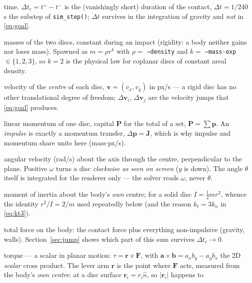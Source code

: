 \documentclass[a4paper,11pt]{article}
\newcommand{\vV}{\bm{v}}
\newcommand{\Jimp}{\bm{J}}
\newcommand{\hh}{\hat{n}}
\newcommand{\pp}{\bm{p}}          %
\newcommand{\PP}{\bm{P}}          %
\newcommand{\rr}{\bm{r}}          %
\newcommand{\dtc}{\Delta t_c}     %
\begin{document}
\begin{description}[style=sameline, itemsep=3pt,
                    labelwidth=*, labelindent=1.8em, leftmargin=!,
                    rightmargin=2.4em]
  \item[$t$] time. $\dtc=t^{+}-t^{-}$ is the (vanishingly short) duration of the
    contact, $\Delta t=1/240$ s the substep of \texttt{sim\_step()};
    $\Delta t$ survives in the integration of gravity and \emph{not} in
    \eqref{eq:goal}.
  \item[$m_i$, $m_j$] masses of the two discs, constant during an impact
    (rigidity: a body neither gains nor loses mass). Spawned as
    $m=\rho r^{k}$ with $\rho=$ \texttt{--density} and $k=$
    \texttt{--mass-exp} $\in\{1,2,3\}$, so $k=2$ is the physical law for
    coplanar discs of constant areal density.
  \item[$\vV_i$, $\vV_j$] velocity of the \emph{centre} of each disc,
    $\vV=(v_x,v_y)$ in px/s --- a rigid disc has no other translational degree
    of freedom; $\Delta\vV_{i}$, $\Delta\vV_{j}$ are the velocity jumps that
    \eqref{eq:goal} produces.
  \item[$\pp=m\vV$, $\PP$] linear momentum of one disc, capital $\PP$ for
    the total of a set, $\PP=\sum\pp$. An \emph{impulse} is exactly a
    momentum transfer, $\Delta\pp=\Jimp$, which is why impulse and momentum
    share units here (mass$\cdot$px/s).
  \item[$\omega_i$, $\omega_j$] angular velocity (rad/s) about the axis through
    the centre, perpendicular to the plane. Positive $\omega$ turns a disc
    \emph{clockwise as seen on screen} ($y$ is down). The angle $\theta$ itself
    is integrated for the renderer only --- the solver reads $\omega$, never
    $\theta$.
  \item[$I_i$, $I_j$] moment of inertia about the body's \emph{own} centre; for
    a solid disc $I=\tfrac12 m r^{2}$, whence the identity $r^{2}/I=2/m$ used
    repeatedly below (and the reason $k_t=3k_n$ in \eqref{eq:kt3}).
  \item[$\sum\bm F$] total force on the body: the contact force plus everything
    non-impulsive (gravity, walls). Section~\ref{sec:jump} shows which part of
    this sum survives $\dtc\to0$.
  \item[$\tau$] torque --- a scalar in planar motion: $\tau=\rr\times\bm F$, with
    $\bm a\times\bm b=a_xb_y-a_yb_x$ the 2D \emph{scalar} cross product. The
    lever arm $\rr$ is the point where $\bm F$ acts, measured from the body's
    \emph{own centre}: at a disc surface $\rr_i=r_i\hh$, so $|\rr_i|$ happens to

\end{description}
\end{document}
